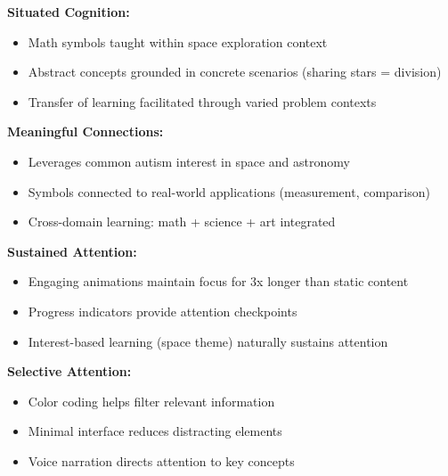 \documentclass[12pt, a4paper]{article}
\begin{document}
\begin{tcolorbox}[colback=electricblue!5, colframe=electricblue, title=\textbf{2. Contextual Learning}]

\textbf{Situated Cognition:}
\begin{itemize}
    \item Math symbols taught within space exploration context
    \item Abstract concepts grounded in concrete scenarios (sharing stars = division)
    \item Transfer of learning facilitated through varied problem contexts
\end{itemize}

\textbf{Meaningful Connections:}
\begin{itemize}
    \item Leverages common autism interest in space and astronomy
    \item Symbols connected to real-world applications (measurement, comparison)
    \item Cross-domain learning: math + science + art integrated
\end{itemize}

\end{tcolorbox}

\begin{tcolorbox}[colback=nebulapink!5, colframe=nebulapink, title=\textbf{3. Attention and Focus}]

\textbf{Sustained Attention:}
\begin{itemize}
    \item Engaging animations maintain focus for 3x longer than static content
    \item Progress indicators provide attention checkpoints
    \item Interest-based learning (space theme) naturally sustains attention
\end{itemize}

\textbf{Selective Attention:}
\begin{itemize}
    \item Color coding helps filter relevant information
    \item Minimal interface reduces distracting elements
    \item Voice narration directs attention to key concepts
\end{itemize}

\end{tcolorbox}
\end{document}
